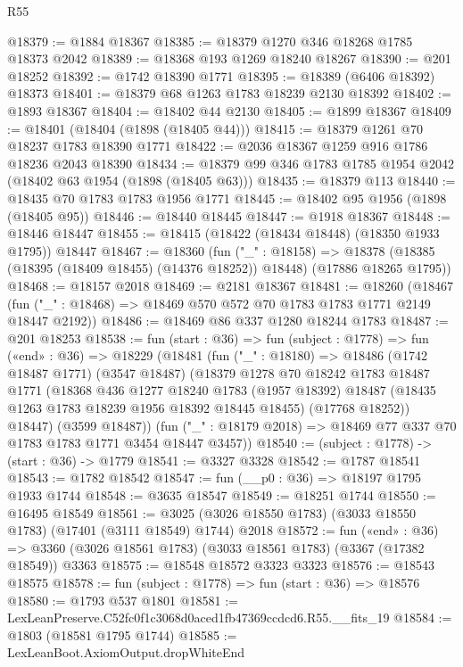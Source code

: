 \begin{lexlean}{R55}
\begin{coremodule}
@18379 := @1884 @18367
@18385 := @18379 @1270 @346 @18268 @1785 @18373 @2042
@18389 := @18368 @193 @1269 @18240 @18267
@18390 := @201 @18252
@18392 := @1742 @18390 @1771
@18395 := @18389 (@6406 @18392) @18373
@18401 := @18379 @68 @1263 @1783 @18239 @2130 @18392
@18402 := @1893 @18367
@18404 := @18402 @44 @2130
@18405 := @1899 @18367
@18409 := @18401 (@18404 (@1898 (@18405 @44)))
@18415 := @18379 @1261 @70 @18237 @1783 @18390 @1771
@18422 := @2036 @18367 @1259 @916 @1786 @18236 @2043 @18390
@18434 := @18379 @99 @346 @1783 @1785 @1954 @2042 (@18402 @63 @1954 (@1898 (@18405 @63)))
@18435 := @18379 @113
@18440 := @18435 @70 @1783 @1783 @1956 @1771
@18445 := @18402 @95 @1956 (@1898 (@18405 @95))
@18446 := @18440 @18445
@18447 := @1918 @18367
@18448 := @18446 @18447
@18455 := @18415 (@18422 (@18434 @18448) (@18350 @1933 @1795)) @18447
@18467 := @18360
    (fun ("_" : @18158) =>
    @18378 (@18385 (@18395 (@18409 @18455) (@14376 @18252)) @18448) (@17886 @18265 @1795))
@18468 := @18157 @2018
@18469 := @2181 @18367
@18481 := @18260
    (@18467 (fun ("_" : @18468) => @18469 @570 @572 @70 @1783 @1783 @1771 @2149 @18447 @2192))
@18486 := @18469 @86 @337 @1280 @18244 @1783
@18487 := @201 @18253
@18538 := fun (start : @36) =>
  fun (subject : @1778) =>
  fun («end» : @36) =>
  @18229
    (@18481
      (fun ("_" : @18180) =>
      @18486
        (@1742 @18487 @1771)
        (@3547 @18487)
        (@18379
          @1278
          @70
          @18242
          @1783
          @18487
          @1771
          (@18368
            @436
            @1277
            @18240
            @1783
            (@1957 @18392)
            @18487
            (@18435 @1263 @1783 @18239 @1956 @18392 @18445 @18455)
            (@17768 @18252))
          @18447)
        (@3599 @18487))
      (fun ("_" : @18179 @2018) => @18469 @77 @337 @70 @1783 @1783 @1771 @3454 @18447 @3457))
@18540 := (subject : @1778) -> (start : @36) -> @1779
@18541 := @3327 @3328
@18542 := @1787 @18541
@18543 := @1782 @18542
@18547 := fun (__p0 : @36) => @18197 @1795 @1933 @1744
@18548 := @3635 @18547
@18549 := @18251 @1744
@18550 := @16495 @18549
@18561 := @3025 (@3026 @18550 @1783) (@3033 @18550 @1783) (@17401 (@3111 @18549) @1744) @2018
@18572 := fun («end» : @36) =>
  @3360 (@3026 @18561 @1783) (@3033 @18561 @1783) (@3367 (@17382 @18549)) @3363
@18575 := @18548 @18572 @3323 @3323
@18576 := @18543 @18575
@18578 := fun (subject : @1778) => fun (start : @36) => @18576
@18580 := @1793 @537 @1801
@18581 := LexLeanPreserve.C52fc0f1c3068d0aced1fb47369ccdcd6.R55.__fits_19
@18584 := @1803 (@18581 @1795 @1744)
@18585 := LexLeanBoot.AxiomOutput.dropWhiteEnd

\end{coremodule}
\end{lexlean}

